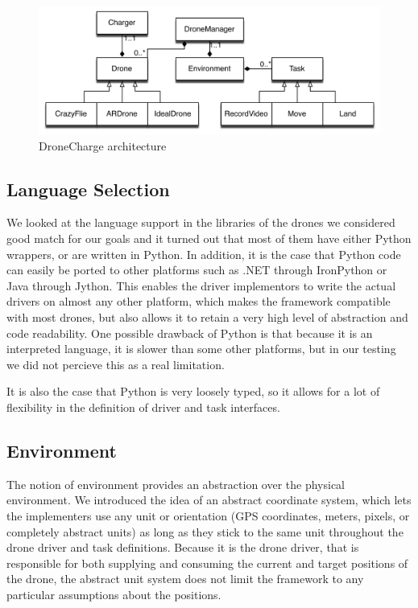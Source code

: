 \begin{figure}[h]
\centering
\includegraphics[width=\columnwidth]{images/dronechargearchitecture.png}
\caption{DroneCharge architecture}
\label{fig:architecturefig}
\end{figure}

\subsection{Language Selection}
We looked at the language support in the libraries of the drones we considered good match for our goals and it turned out that most of them have either Python wrappers, or are written in Python. In addition, it is the case that Python code can easily be ported to other platforms such as .NET through IronPython or Java through Jython. This enables the driver implementors to write the actual drivers on almost any other platform, which makes the framework compatible with most drones, but also allows it to retain a very high level of abstraction and code readability. One possible drawback of Python is that because it is an interpreted language, it is slower than some other platforms, but in our testing we did not percieve this as a real limitation. 

It is also the case that Python is very loosely typed, so it allows for a lot of flexibility in the definition of driver and task interfaces.

\subsection{Environment}
The notion of environment provides an abstraction over the physical environment. We introduced the idea of an abstract coordinate system, which lets the implementers use any unit or orientation (GPS coordinates, meters, pixels, or completely abstract units) as long as they stick to the same unit throughout the drone driver and task definitions. Because it is the drone driver, that is responsible for both supplying and consuming the current and target positions of the drone, the abstract unit system does not limit the framework to any particular assumptions about the positions.

